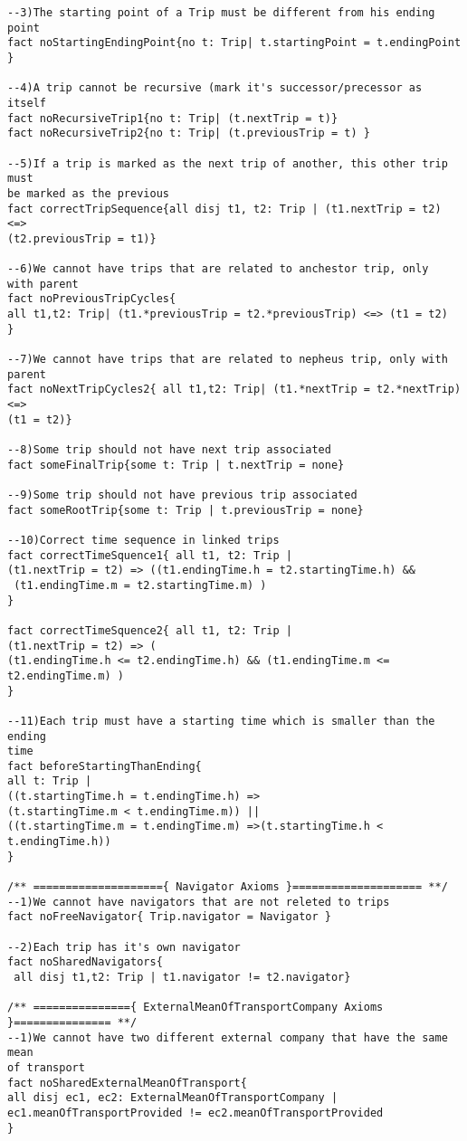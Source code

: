 \documentclass[a4paper,leqno]{book}
\begin{document}
\begin{lstlisting}
--3)The starting point of a Trip must be different from his ending point
fact noStartingEndingPoint{no t: Trip| t.startingPoint = t.endingPoint }

--4)A trip cannot be recursive (mark it's successor/precessor as itself
fact noRecursiveTrip1{no t: Trip| (t.nextTrip = t)}
fact noRecursiveTrip2{no t: Trip| (t.previousTrip = t) }

--5)If a trip is marked as the next trip of another, this other trip must
be marked as the previous
fact correctTripSequence{all disj t1, t2: Trip | (t1.nextTrip = t2) <=> 
(t2.previousTrip = t1)}

--6)We cannot have trips that are related to anchestor trip, only
with parent
fact noPreviousTripCycles{ 
all t1,t2: Trip| (t1.*previousTrip = t2.*previousTrip) <=> (t1 = t2)	}

--7)We cannot have trips that are related to nepheus trip, only with
parent
fact noNextTripCycles2{ all t1,t2: Trip| (t1.*nextTrip = t2.*nextTrip) <=> 
(t1 = t2)}

--8)Some trip should not have next trip associated
fact someFinalTrip{some t: Trip | t.nextTrip = none}

--9)Some trip should not have previous trip associated
fact someRootTrip{some t: Trip | t.previousTrip = none}

--10)Correct time sequence in linked trips
fact correctTimeSquence1{ all t1, t2: Trip |
(t1.nextTrip = t2) => ((t1.endingTime.h = t2.startingTime.h) &&
 (t1.endingTime.m = t2.startingTime.m) )
}

fact correctTimeSquence2{ all t1, t2: Trip |
(t1.nextTrip = t2) => (
(t1.endingTime.h <= t2.endingTime.h) && (t1.endingTime.m <= t2.endingTime.m) )
}

--11)Each trip must have a starting time which is smaller than the ending
time
fact beforeStartingThanEnding{
all t: Trip |
((t.startingTime.h = t.endingTime.h) =>
(t.startingTime.m < t.endingTime.m)) || 
((t.startingTime.m = t.endingTime.m) =>(t.startingTime.h < t.endingTime.h))
}

/** ===================={ Navigator Axioms }==================== **/
--1)We cannot have navigators that are not releted to trips
fact noFreeNavigator{ Trip.navigator = Navigator }

--2)Each trip has it's own navigator
fact noSharedNavigators{
 all disj t1,t2: Trip | t1.navigator != t2.navigator}

/** ==============={ ExternalMeanOfTransportCompany Axioms }=============== **/
--1)We cannot have two different external company that have the same mean
of transport
fact noSharedExternalMeanOfTransport{
all disj ec1, ec2: ExternalMeanOfTransportCompany |
ec1.meanOfTransportProvided != ec2.meanOfTransportProvided
}


\end{lstlisting}
\end{document}

